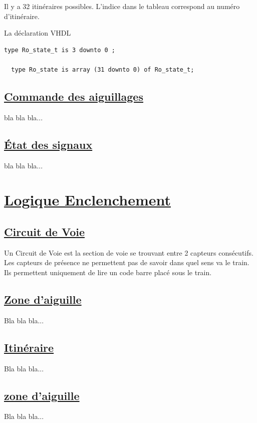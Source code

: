 Il y a 32 itinéraires possibles. L'indice dans le tableau correspond au numéro d'itinéraire.

\medskip
La déclaration VHDL
\begin{lstlisting}[style=vhdl]
  type Ro_state_t is 3 downto 0 ;

  type Ro_state is array (31 downto 0) of Ro_state_t;  
\end{lstlisting}


\subsection{\underline{Commande des aiguillages}}
\label{sec:cmd_aig}

bla bla bla...

\subsection{\underline{\'Etat des signaux}}
\label{sec:st_sig}

bla bla bla...
  







\newpage
\section{\underline{Logique Enclenchement}}
\label{sec:log_enc}

\subsection{\underline{Circuit de Voie}}
\label{sec:CdV}

Un Circuit de Voie est la section de voie se trouvant entre 2 capteurs
consécutifs. Les capteurs de présence ne permettent pas de savoir dans
quel sens va le train. Ils permettent uniquement de lire un code barre
placé sous le train.  

\subsection{\underline{Zone d'aiguille}}
\label{sec:aig}

Bla bla bla...


\subsection{\underline{Itinéraire}}
\label{sec:iti}

Bla bla bla...

\subsection{\underline{zone d'aiguille}}
\label{sec:aig}

Bla bla bla...



\newpage





